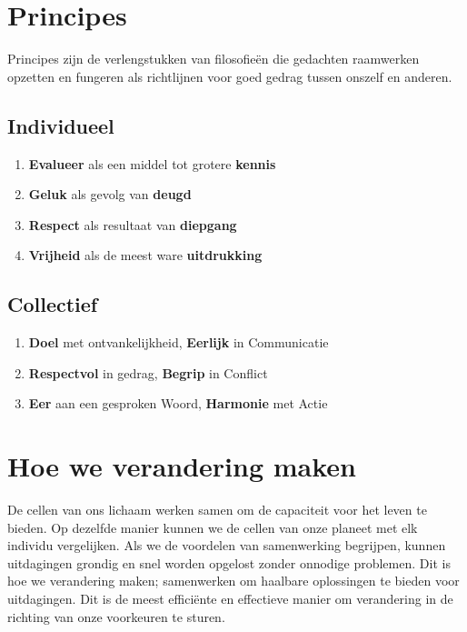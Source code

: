 \documentclass[11pt]{article}
\begin{document}
\section{Principes}

Principes zijn de verlengstukken van filosofieën die gedachten raamwerken opzetten en fungeren als richtlijnen voor goed gedrag tussen onszelf en anderen.

\subsection{Individueel}

\begin{enumerate}
\item \textbf{Evalueer} als een middel tot grotere \textbf{kennis}
\item \textbf{Geluk} als gevolg van \textbf{deugd}
\item \textbf{Respect} als resultaat van \textbf{diepgang}
\item \textbf{Vrijheid} als de meest ware \textbf{uitdrukking}
\end{enumerate}

\subsection{Collectief}

\begin{enumerate}
\item \textbf{Doel} met ontvankelijkheid, \textbf{Eerlijk} in Communicatie
\item \textbf{Respectvol} in gedrag, \textbf{Begrip} in Conflict
\item \textbf{Eer} aan een gesproken Woord, \textbf{Harmonie} met Actie
\end{enumerate}

\section{Hoe we verandering maken}

De cellen van ons lichaam werken samen om de capaciteit voor het leven te bieden. Op dezelfde manier kunnen we de cellen van onze planeet met elk individu vergelijken. Als we de voordelen van samenwerking begrijpen, kunnen uitdagingen grondig en snel worden opgelost zonder onnodige problemen. Dit is hoe we verandering maken; samenwerken om haalbare oplossingen te bieden voor uitdagingen. Dit is de meest efficiënte en effectieve manier om verandering in de richting van onze voorkeuren te sturen.\\
\end{document}
